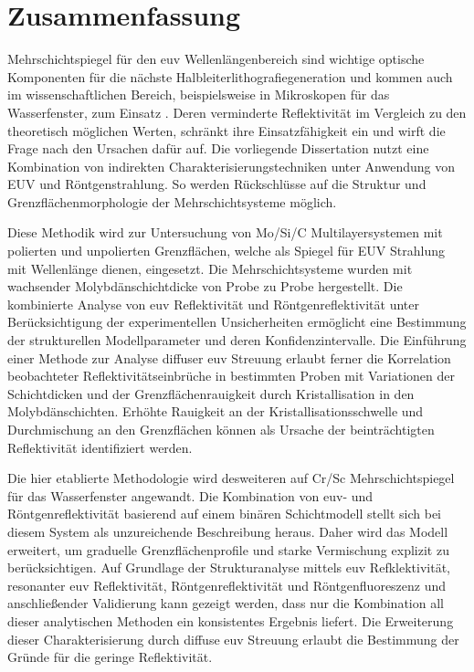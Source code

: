 \cleardoublepage

\thispagestyle{empty}

\section*{Zusammenfassung}
    
    Mehrschichtspiegel für den \gls{euv} Wellenlängenbereich sind wichtige optische Komponenten für die nächste Halbleiterlithografiegeneration und kommen auch im wissenschaftlichen Bereich, beispielsweise in Mikroskopen für das Wasserfenster, zum Einsatz . Deren verminderte Reflektivität im Vergleich zu den theoretisch möglichen Werten, schränkt ihre Einsatzfähigkeit ein und wirft die Frage nach den Ursachen dafür auf. Die vorliegende Dissertation nutzt eine Kombination von indirekten Charakterisierungstechniken unter Anwendung von EUV und Röntgenstrahlung. So werden Rückschlüsse auf die Struktur und Grenzflächenmorphologie der Mehrschichtsysteme möglich.
    
    Diese Methodik wird zur Untersuchung von Mo/Si/C Multilayersystemen mit polierten und unpolierten Grenzflächen, welche als Spiegel für EUV Strahlung mit  Wellenlänge dienen, eingesetzt. Die Mehrschichtsysteme wurden mit wachsender Molybdänschichtdicke von Probe zu Probe hergestellt. Die kombinierte Analyse von \gls{euv} Reflektivität und Röntgenreflektivität unter Berücksichtigung der experimentellen Unsicherheiten ermöglicht eine Bestimmung der strukturellen Modellparameter und deren Konfidenzintervalle. Die Einführung einer Methode zur Analyse diffuser \gls{euv} Streuung erlaubt ferner die Korrelation beobachteter Reflektivitätseinbrüche in bestimmten Proben mit Variationen der Schichtdicken und der Grenzflächenrauigkeit durch Kristallisation in den Molybdänschichten. Erhöhte Rauigkeit an der Kristallisationsschwelle und Durchmischung an den Grenzflächen können als Ursache der beinträchtigten Reflektivität identifiziert werden.
	
	Die hier etablierte Methodologie wird desweiteren auf Cr/Sc Mehrschichtspiegel für das Wasserfenster angewandt. Die Kombination von \gls{euv}- und Röntgenreflektivität basierend auf einem binären Schichtmodell stellt sich bei diesem System als unzureichende Beschreibung heraus. Daher wird das Modell erweitert, um graduelle Grenzflächenprofile und starke Vermischung explizit zu berücksichtigen. Auf Grundlage der Strukturanalyse mittels \gls{euv} Refklektivität, resonanter \gls{euv} Reflektivität, Röntgenreflektivität und Röntgenfluoreszenz und anschließender Validierung kann gezeigt werden, dass nur die Kombination all dieser analytischen Methoden ein konsistentes Ergebnis liefert. Die Erweiterung dieser Charakterisierung durch diffuse \gls{euv} Streuung erlaubt die Bestimmung der Gründe für die geringe Reflektivität.

\cleardoublepage
